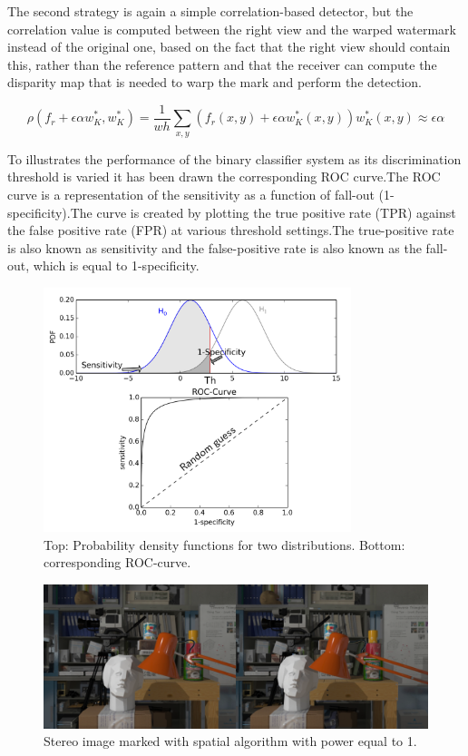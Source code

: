 The second strategy is again a simple correlation-based detector, but the correlation value is computed between the right view and the warped watermark instead of the original one, based on the fact that the right view should contain this, rather than the reference pattern and that the receiver can compute the disparity map that is needed to warp the mark and perform the detection.

$$\rho(f_{r}+\epsilon\alpha w_{K}^{*},w_{K}^{*})= \frac{1}{wh}\sum_{x,y}(f_{r}(x,y)+\epsilon\alpha w_{K}^{*}(x,y))w_{K}^{*}(x,y)\approx\epsilon\alpha $$

To illustrates the performance of the binary classifier system as its discrimination threshold is varied it has been drawn the corresponding ROC curve.\newline  The ROC curve is a representation of the sensitivity as a function of fall-out (1-specificity).\newline  The curve is created by plotting the true positive rate (TPR) against the false positive rate (FPR) at various threshold settings.\newline The true-positive rate is also known as sensitivity and the false-positive rate is also known as the fall-out, which is equal to 1-specificity.\newline  

\begin{figure}[h!]
\centering
\includegraphics[width=0.8\textwidth]{./img/roc.png}
\caption{\small{Top: Probability density functions for two distributions. Bottom: corresponding ROC-curve.}}
\label{fig:roc}
\end{figure}

\begin{figure}[h!]
\centering
\includegraphics[width=1\textwidth]{./img/marked_1_gauss.png}
\caption{\small{Stereo image marked with spatial algorithm with power equal to 1.}}
\label{fig:gauss1}
\end{figure}

